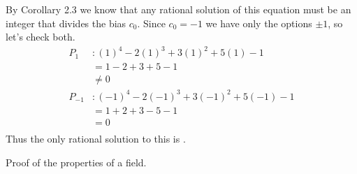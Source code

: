 \documentclass{homework}
\begin{document}
\maketitle


\question
By Corollary 2.3 we know that any rational solution of this equation must be an integer that divides the bias $c_0$. Since $c_0 = -1$ we have only the options $\pm 1$, so let's check both.
\begin{align*}
    P_1 &: (1)^4 - 2(1)^3 + 3(1)^2 + 5(1) - 1   \\
        &=	1 - 2 + 3 + 5 - 1	\\
        &\ne 0  \\
    P_{-1} &: (-1)^4 - 2(-1)^3 + 3(-1)^2 + 5(-1) - 1   \\
        &=	1 + 2 + 3 - 5 - 1	\\
        &= 0  \\
\end{align*}
Thus the only rational solution to this is .


\question
Proof of the properties of a field.
\end{document}
